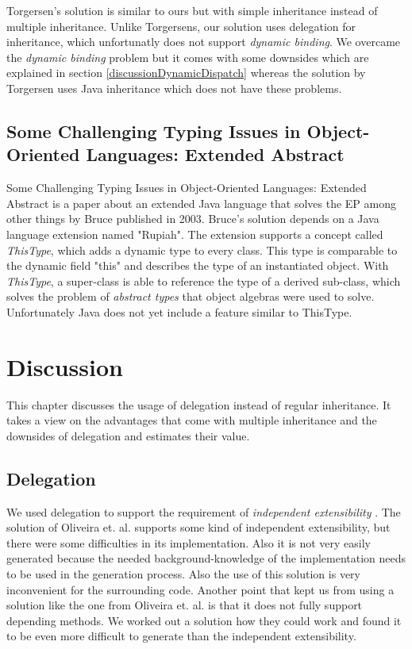 \documentclass{report}
\begin{document}
Torgersen's solution is similar to ours but with simple inheritance instead of multiple inheritance.
Unlike Torgersens, our solution uses delegation for inheritance, which unfortunatly does not support \emph{dynamic binding}. We overcame the \emph{dynamic binding} problem but it comes with some downsides which are explained in section \ref{discussionDynamicDispatch} whereas the solution by Torgersen uses Java inheritance which does not have these problems.

\subsection*{Some Challenging Typing Issues in Object-Oriented Languages: Extended Abstract}

{Some Challenging Typing Issues in Object-Oriented Languages: Extended Abstract} is a paper about an extended Java language that solves the EP among other things by Bruce published in 2003\cite{Bruce-Typing-2003}.
Bruce's solution depends on a Java language extension named "Rupiah"\cite{Foster-Rupiah-2001}. The extension supports a concept called \emph{ThisType}, which adds a dynamic type to every class. This type is comparable to the dynamic field "this" and describes the type of an instantiated object. With \emph{ThisType}, a super-class is able to reference the type of a derived sub-class, which solves the problem of \emph{abstract types} that object algebras were used to solve. Unfortunately Java does not yet include a feature similar to ThisType.

\section{Discussion}

This chapter discusses the usage of delegation instead of regular inheritance. It takes a view on the advantages that come with multiple inheritance and the downsides of delegation and estimates their value.

\subsection{Delegation}
We used delegation to support the requirement of \emph{independent extensibility} \cite{Odersky-Expression-2005, Oliv-Extensibility-2012}. The solution of Oliveira et. al. supports some kind of independent extensibility, but there were some difficulties in its implementation. Also it is not very easily generated because the needed background-knowledge of the implementation needs to be used in the generation process. Also the use of this solution is very inconvenient for the surrounding code. Another point that kept us from using a solution like the one from Oliveira et. al. is that it does not fully support depending methods. We worked out a solution how they could work and found it to be even more difficult to generate than the independent extensibility.
\end{document}
